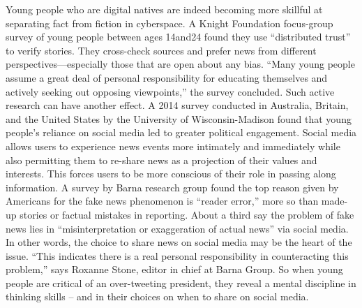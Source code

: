 Young people who are digital natives are indeed becoming more skillful at separating fact from fiction in cyberspace. A Knight Foundation focus-group survey of young people between ages 14and24 found they use “distributed trust” to verify stories. They cross-check sources and prefer news from different perspectives—especially those that are open about any bias. “Many young people assume a great deal of personal responsibility for educating themselves and actively seeking out opposing viewpoints,” the survey concluded.
Such active research can have another effect. A 2014 survey conducted in Australia, Britain, and the United States by the University of Wisconsin-Madison found that young people’s reliance on social media led to greater political engagement.
Social media allows users to experience news events more intimately and immediately while also permitting them to re-share news as a projection of their values and interests. This forces users to be more conscious of their role in passing along information. A survey by Barna research group found the top reason given by Americans for the fake news phenomenon is “reader error,” more so than made-up stories or factual mistakes in reporting. About a third say the problem of fake news lies in “misinterpretation or exaggeration of actual news” via social media. In other words, the choice to share news on social media may be the heart of the issue. “This indicates there is a real personal responsibility in counteracting this problem,” says Roxanne Stone, editor in chief at Barna Group.
So when young people are critical of an over-tweeting president, they reveal a mental discipline in thinking skills – and in their choices on when to share on social media.
